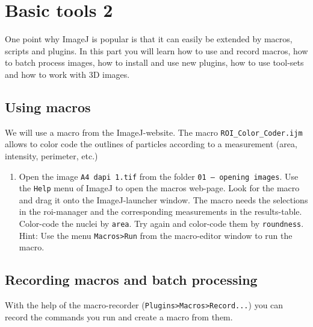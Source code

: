 \chapter{Basic tools 2}

One point why ImageJ is popular is that it can easily be extended by macros, scripts and plugins. In this part you will learn how to use and record macros, how to batch process images, how to install and use new plugins, how to use tool-sets and how to work with 3D images.

\section{Using macros}

We will use a macro from the ImageJ-website. The macro \texttt{ROI\_Color\_Coder.ijm} allows to color code the outlines of particles according to a measurement (area, intensity, perimeter, etc.)

\begin{enumerate}
\item Open the image \texttt{A4 dapi 1.tif} from the folder \texttt{01 – opening images}. Use the \texttt{Help} menu of ImageJ to open the macros web-page. Look for the macro and drag it onto the ImageJ-launcher window. The macro needs the selections in the roi-manager and the corresponding
measurements in the results-table. Color-code the nuclei by \texttt{area}. Try again and color-code them by \texttt{roundness}. Hint: Use the menu \texttt{Macros>Run} from the macro-editor window to run the macro.
\end{enumerate}

\section{Recording macros and batch processing}

With the help of the macro-recorder (\texttt{Plugins>Macros>Record...}) you can record the commands you run and create a macro from them.

